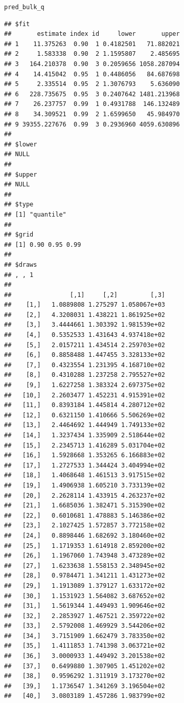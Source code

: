 \documentclass[article]{jss}\usepackage[]{graphicx}\usepackage[]{xcolor}
\makeatletter
\newcommand{\hldef}[1]{\textcolor[rgb]{0.345,0.345,0.345}{#1}}%
\newenvironment{kframe}{%
 \def\at@end@of@kframe{}%
 \ifinner\ifhmode%
  \def\at@end@of@kframe{\end{minipage}}%
  \begin{minipage}{\columnwidth}%
 \fi\fi%
 \def\FrameCommand##1{\hskip\@totalleftmargin \hskip-\fboxsep
 \colorbox{shadecolor}{##1}\hskip-\fboxsep
     \hskip-\linewidth \hskip-\@totalleftmargin \hskip\columnwidth}%
 \MakeFramed {\advance\hsize-\width
   \@totalleftmargin\z@ \linewidth\hsize
   \@setminipage}}%
 {\par\unskip\endMakeFramed%
 \at@end@of@kframe}
\newenvironment{knitrout}{}{} %
\makeatother
\begin{document}
\begin{knitrout}
\begin{kframe}
\begin{alltt}
\hldef{pred_bulk_q}
\end{alltt}
\begin{verbatim}
## $fit
##       estimate index id     lower       upper
## 1    11.375263  0.90  1 0.4182501   71.882021
## 2     1.583338  0.90  2 1.1595807    2.485695
## 3   164.210378  0.90  3 0.2059656 1058.287094
## 4    14.415042  0.95  1 0.4486056   84.687698
## 5     2.335514  0.95  2 1.3076793    5.636090
## 6   228.735675  0.95  3 0.2407642 1481.213968
## 7    26.237757  0.99  1 0.4931788  146.132489
## 8    34.309521  0.99  2 1.6599650   45.984970
## 9 39355.227676  0.99  3 0.2936960 4059.630896
## 
## $lower
## NULL
## 
## $upper
## NULL
## 
## $type
## [1] "quantile"
## 
## $grid
## [1] 0.90 0.95 0.99
## 
## $draws
## , , 1
## 
##                [,1]     [,2]         [,3]
##    [1,]   1.0889808 1.275297 1.058067e+03
##    [2,]   4.3208031 1.438221 1.861925e+02
##    [3,]   3.4444661 1.303392 1.981539e+02
##    [4,]   0.5352533 1.431643 4.937418e+02
##    [5,]   2.0157211 1.434514 2.259703e+02
##    [6,]   0.8858488 1.447455 3.328133e+02
##    [7,]   0.4323554 1.231395 4.168710e+02
##    [8,]   0.4310288 1.237258 2.795527e+02
##    [9,]   1.6227258 1.383324 2.697375e+02
##   [10,]   2.2603477 1.452231 4.915391e+02
##   [11,]   0.8393184 1.445814 4.280712e+02
##   [12,]   0.6321150 1.410666 5.506269e+02
##   [13,]   2.4464692 1.444949 1.749133e+02
##   [14,]   1.3237434 1.335909 2.518644e+02
##   [15,]   2.2345713 1.416289 5.031704e+02
##   [16,]   1.5928668 1.353265 6.166883e+02
##   [17,]   1.2727533 1.344424 3.404994e+02
##   [18,]   1.4068648 1.461513 3.917515e+02
##   [19,]   1.4906938 1.605210 3.733139e+02
##   [20,]   2.2628114 1.433915 4.263237e+02
##   [21,]   1.6685036 1.382471 5.315390e+02
##   [22,]   0.6010681 1.478883 5.146386e+02
##   [23,]   2.1027425 1.572857 3.772158e+02
##   [24,]   0.8898446 1.682692 3.180460e+02
##   [25,]   1.1719353 1.614918 2.859200e+02
##   [26,]   1.1967060 1.743948 3.473289e+02
##   [27,]   1.6233638 1.558153 2.348945e+02
##   [28,]   0.9784471 1.341211 1.431273e+02
##   [29,]   1.1913089 1.379127 1.633172e+02
##   [30,]   1.1531923 1.564082 3.687652e+02
##   [31,]   1.5619344 1.449493 1.909646e+02
##   [32,]   2.2853927 1.467521 2.359722e+02
##   [33,]   2.5792008 1.469929 3.544206e+02
##   [34,]   3.7151909 1.662479 3.783350e+02
##   [35,]   1.4111853 1.741398 3.063721e+02
##   [36,]   3.0000933 1.449492 3.201538e+02
##   [37,]   0.6499880 1.307905 1.451202e+02
##   [38,]   0.9596292 1.311919 3.173270e+02
##   [39,]   1.1736547 1.341269 3.196504e+02
##   [40,]   3.0803189 1.457286 1.983799e+02

\end{verbatim}
\end{kframe}
\end{knitrout}
\end{document}

